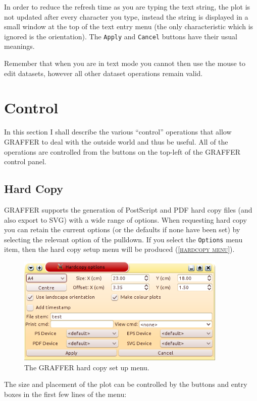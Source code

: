 \documentclass[11pt,twoside,english]{article}
\begin{document}
In order to reduce the refresh time as you are typing the text string,
the plot is not updated after every character you type, instead the
string is displayed in a small window at the top of the text entry menu
(the only characteristic which is ignored is the orientation).  The
\texttt{Apply} and \texttt{Cancel} buttons have their usual meanings.

Remember that when you are in text mode you cannot then use the mouse
to edit datasets, however all other dataset operations remain valid.


\section{Control}

In this section I shall describe the various {}``control'' operations
that allow GRAFFER to deal with the outside world and thus be useful.
All of the operations are controlled from the buttons on the top-left
of the GRAFFER control panel.


\subsection{Hard Copy}

GRAFFER supports the generation of PostScript and PDF hard copy files
(and also export to SVG) with a wide range of options. When requesting
hard copy you can retain the current options (or the defaults if none
have been set) by selecting the relevant option of the
pulldown. If you select the \texttt{Options} menu item, then the hard copy
setup menu will be produced (\textsc{\autoref{hardcopy menu}}).

 \begin{figure}[htbp]
   \centering
   \includegraphics[width=10cm]{hardopts}
   \caption{The GRAFFER hard copy set up menu.}
   \label{hardcopy menu}
 \end{figure}
 The size and placement of the plot can be controlled by the buttons
 and entry boxes in the first few lines of the menu:
\end{document}
